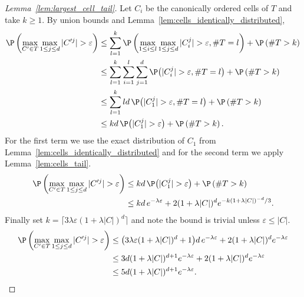 \documentclass{article}
\begin{document}
\begin{proof}[Lemma~\ref{lem:largest_cell_tail}]

  Let $C_i$ be the canonically ordered cells of $T$
  and take $k \geq 1$.
  By union bounds and
  Lemma~\ref{lem:cells_identically_distributed},
  \begin{align*}
    \P\left(
    \max_{C' \in T}
    \max_{1 \leq j \leq d}
    |C'^j| > \varepsilon
    \right)
    &\leq
      \sum_{l=1}^k
      \P\left(
      \max_{1 \leq i \leq l}
      \max_{1 \leq j \leq d}
      |C_i^j| > \varepsilon,
      \# T = l
      \right)
      + \P\left( \# T > k \right) \\
    &\leq
      \sum_{l=1}^k
      \sum_{i=1}^l
      \sum_{j=1}^d
      \P\big(
      |C_i^j| > \varepsilon,
      \# T = l
      \big)
      + \P\left( \# T > k \right) \\
    &\leq
      \sum_{l=1}^k
      l d \,
      \P\big(
      |C_1^j| > \varepsilon,
      \# T = l
      \big)
      + \P\left( \# T > k \right) \\
    &\leq
      k d \,
      \P\big(|C_1^j| > \varepsilon \big)
      + \P\left( \# T > k \right).
  \end{align*}
  For the first term we use the exact distribution of
  $C_1$ from Lemma~\ref{lem:cells_identically_distributed}
  and for the second term we apply Lemma~\ref{lem:cells_tail}.
  \begin{align*}
    \P\left(
    \max_{C' \in T}
    \max_{1 \leq j \leq d}
    |C'^j| > \varepsilon
    \right)
    &\leq
      k d \, \P\big(|C_1^j| > \varepsilon \big)
      + \P\left( \# T > k \right) \\
    &\leq
      kd \, e^{-\lambda \varepsilon}
      + 2 (1 + \lambda |C|)^d
      e^{-k (1 + \lambda |C|)^{-d} / 3}.
  \end{align*}
  Finally set
  $k = \big\lceil 3 \lambda \varepsilon (1 + \lambda |C|)^d \big\rceil$
  and note the bound is trivial unless $\varepsilon \leq |C|$.
  \begin{align*}
    \P\left(
    \max_{C' \in T}
    \max_{1 \leq j \leq d}
    |C'^j| > \varepsilon
    \right)
    &\leq
      \big( 3 \lambda \varepsilon (1 + \lambda |C|)^d + 1 \big)
      d \, e^{-\lambda \varepsilon}
      + 2 (1 + \lambda |C|)^d
      e^{-\lambda \varepsilon} \\
    &\leq
      3d (1 + \lambda |C|)^{d+1}
      e^{-\lambda \varepsilon}
      + 2 (1 + \lambda |C|)^d
      e^{-\lambda \varepsilon} \\
    &\leq
      5d (1 + \lambda |C|)^{d+1}
      e^{-\lambda \varepsilon}.
  \end{align*}
\end{proof}
\end{document}
